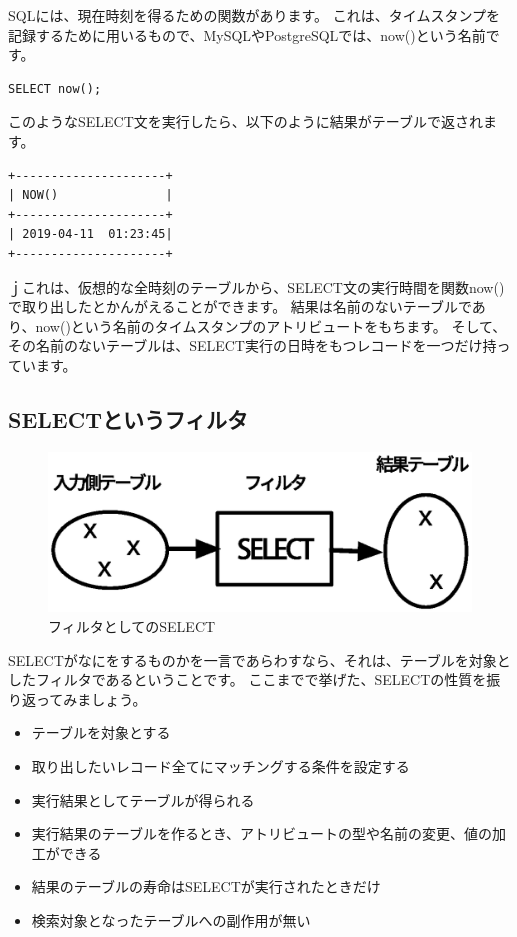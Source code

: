 SQLには、現在時刻を得るための関数があります。
これは、タイムスタンプを記録するために用いるもので、MySQLやPostgreSQLでは、now()という名前です。

\begin{verbatim}
SELECT now();
\end{verbatim}

このようなSELECT文を実行したら、以下のように結果がテーブルで返されます。

\begin{verbatim}
+---------------------+
| NOW()               |
+---------------------+
| 2019-04-11  01:23:45| 
+---------------------+
\end{verbatim}

ｊこれは、仮想的な全時刻のテーブルから、SELECT文の実行時間を関数now()で取り出したとかんがえることができます。
結果は名前のないテーブルであり、now()という名前のタイムスタンプのアトリビュートをもちます。
そして、その名前のないテーブルは、SELECT実行の日時をもつレコードを一つだけ持っています。

\subsection{SELECTというフィルタ}

\begin{figure}[htbp]
	\includegraphics[width=12cm,clip]{draw/filter.eps}
	\caption{フィルタとしてのSELECT}
	\label{fig:filter}
\end{figure}

SELECTがなにをするものかを一言であらわすなら、それは、テーブルを対象としたフィルタであるということです。
ここまでで挙げた、SELECTの性質を振り返ってみましょう。

\begin{itemize}
  \item テーブルを対象とする
  \item 取り出したいレコード全てにマッチングする条件を設定する
  \item 実行結果としてテーブルが得られる
  \item 実行結果のテーブルを作るとき、アトリビュートの型や名前の変更、値の加工ができる
  \item 結果のテーブルの寿命はSELECTが実行されたときだけ
  \item 検索対象となったテーブルへの副作用が無い
\end{itemize}


